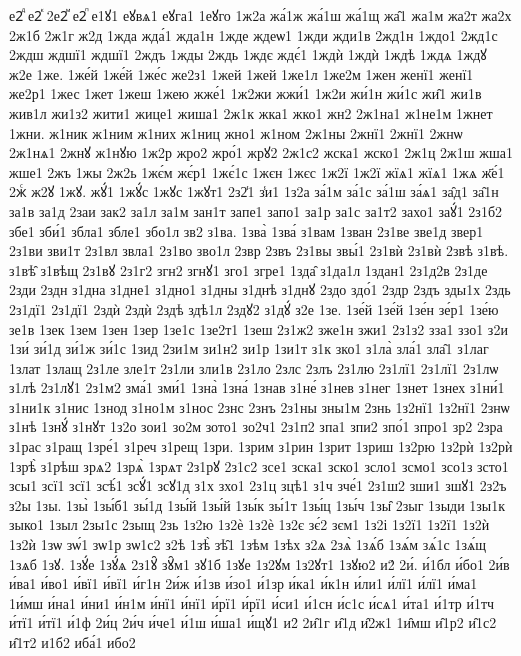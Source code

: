{е2ⷣ
е2ⷦ
2е2ⷨ
е2ⷫ
е1ꙋ1
еꙋвѧ1
еꙋга1
1еꙋго
1ж2а
жа́1ж
жа́1ш
жа́1щ
жа̑1
жа1м
жа2т
жа2х
2ж1б
2ж1г
ж2д
1жда
жда́1
жда1н
1жде
ждеѡ1
1жди
жди1в
2жд1н
1ждо1
2жд1с
2ждш
ждшї1
ждшї1
2ждъ
1жды
2ждь
1ждє
ждє́1
1ждѝ
1ждѝ
1ждѣ
1ждѧ
1ждꙋ
ж2е
1же.
1же́й
1же́й
1же́с
же2з1
1жей
1жей
1же1л
1же2м
1жен
женї1
женї1
же2р1
1жес
1жет
1жеш
1жею
жже́1
1ж2жи
жжи́1
1ж2и
жи́1н
жи́1с
жи̑1
жи1в
жив1л
жи1з2
жити1
жице1
жиша1
2ж1к
жка1
жко1
жн2
2ж1на1
ж1не1м
1жнет
1жни.
ж1ник
ж1ним
ж1них
ж1ниц
жно1
ж1ном
2ж1ны
2жнї1
2жнї1
2жнѡ
2ж1нѧ1
2жнꙋ
ж1нꙋю
1ж2р
жро2
жро́1
жрꙋ2
2ж1с2
жска1
жско1
2ж1ц
2ж1ш
жша1
жше1
2жъ
1жы
2ж2ь
1жє́м
жє́р1
1жє́1с
1жєн
1жєс
1ж2ї
1ж2ї
жїѧ1
жїѧ1
1жѧ
ж҃е́1
2жⷭ
ж2ꙋ
1жꙋ.
жꙋ́1
1жꙋ́с
1жꙋс
1жꙋт1
2з2̾1
з̾и1
1з2а
за́1м
за́1с
за́1ш
за́ѧ1
за̑д1
за̑1н
за1в
за1д
2заи
зак2
за1л
за1м
зан1т
запе1
запо1
за1р
за1с
за1т2
захо1
заꙋ́1
2з1б2
збе1
зби́1
збла1
збле1
збо1л
зв2
з1ва.
1зва̀
1зва́
з1вам
1зван
2з1ве
зве1д
звер1
2з1ви
зви1т
2з1вл
звла1
2з1во
зво1л
2звр
2звъ
2з1вы
звы́1
2з1вѝ
2з1вѝ
2звѣ
з1вѣ.
з1вѣ̑
з1вѣщ
2з1вꙋ
2з1г2
згн2
згнꙋ1
зго1
згре1
1зда̑
з1да1л
1здан1
2з1д2в
2з1де
2зди
2здн
з1дна
з1дне1
з1дно1
з1дны
з1днѣ
з1днꙋ
2здо
здо́1
2здр
2здъ
зды1х
2здь
2з1дї1
2з1дї1
2здѝ
2здѝ
2здѣ
здѣ1л
2здꙋ2
з1дꙋ́
з2е
1зе.
1зе́й
1зе́й
1зе́н
зе́р1
1зе́ю
зе1в
1зек
1зем
1зен
1зер
1зе1с
1зе2т1
1зеш
2з1ж2
зже1н
зжи1
2з1з2
зза1
ззо1
з2и
1зи́
зи́1д
зи́1ж
зи́1с
1зид
2зи1м
зи1н2
зи1р
1зи1т
з1к
зко1
з1ла̀
зла́1
зла̑1
з1лаг
1злат
1злащ
2з1ле
зле1т
2з1ли
зли1в
2з1ло
2злс
2злъ
2з1лю
2з1лї1
2з1лї1
2з1лѡ
з1лѣ
2з1лꙋ1
2з1м2
зма́1
зми́1
1зна̀
1зна́
1знав
з1не́
з1нев
з1нег
1знет
1знех
з1ни́1
з1ни1к
з1нис
1знод
з1но1м
з1нос
2знс
2знъ
2з1ны
зны1м
2знь
1з2нї1
1з2нї1
2знѡ
з1нѣ
1знꙋ́
з1нꙋт
1з2о
зои1
зо2м
зото1
зо2ч1
2з1п2
зпа1
зпи2
зпо́1
зпро1
зр2
2зра
з1рас
з1ращ
1зре́1
з1реч
з1рещ
1зри.
1зрим
з1рин
1зрит
1зриш
1з2рю
1з2рѝ
1з2рѝ
1зрѣ̀
з1рѣш
зрѧ2
1зрѧ̀
1зрѧт
2з1рꙋ
2з1с2
зсе1
зска1
зско1
зсло1
зсмо1
зсо1з
зсто1
зсы1
зсї1
зсї1
зсѣ́1
зсꙋ́1
зсꙋ1д
з1х
зхо1
2з1ц
зцѣ1
з1ч
зче́1
2з1ш2
зши1
зшꙋ1
2з2ъ
з2ы
1зы.
1зы̀
1зы́б1
зы́1д
1зы́й
1зы́й
1зы́к
зы́1т
1зы́ц
1зы́ч
1зы̑
2зыг
1зыди
1зы1к
зыко1
1зыл
2зы1с
2зыщ
2зь
1з2ю
1з2ѐ
1з2ѐ
1з2є
зє́2
зєм1
1з2і
1з2ї1
1з2ї1
1з2ѝ
1з2ѝ
1зѡ
зѡ́1
зѡ1р
зѡ1с2
з2ѣ
1зѣ̀
зѣ̑1
1зѣм
1зѣх
з2ѧ
2зѧ̀
1зѧ́б
1зѧ́м
зѧ́1с
1зѧ́щ
1зѧб
1зꙋ.
1зꙋ́е
1зꙋ́ѧ
2з1ꙋ̑
зꙋ̑м1
зꙋ1б
1зꙋе
1з2ꙋм
1з2ꙋт1
1зꙋю2
и2́
2и́.
и́1бл
и́бо1
2и́в
и́ва1
и́во1
и́вї1
и́вї1
и́г1н
2и́ж
и́1зв
и́зо1
и́1зр
и́ка1
и́к1н
и́ли1
и́лї1
и́лї1
и́ма1
1и́мш
и́на1
и́ни1
и́н1м
и́нї1
и́нї1
и́рї1
и́рї1
и́си1
и́1сн
и́с1с
и́сѧ1
и́та1
и́1тр
и́1тч
и́тї1
и́тї1
и́1ф
2и́ц
2и́ч
и́че1
и́1ш
и́ша1
и́щꙋ1
и2̑
2и̑1г
и̑1д
и̑2ж1
1и̑мш
и̑1р2
и̑1с2
и̑1т2
и1б2
иба́1
ибо2
}
